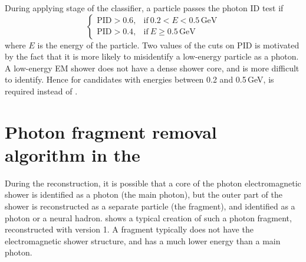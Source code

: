 During applying stage of the classifier, a particle passes the photon ID test if
\begin{equation}
\begin{cases}
  \text{PID} > 0.6, & \text{if}\ 0.2 < E < 0.5\,\text{GeV}\\
  \text{PID} > 0.4, & \text{if}\ E \geqslant 0.5\,\text{GeV}
\end{cases}
\end{equation}
where $E$ is the energy of the particle. Two values of the cuts on $\text{PID}$ is motivated by the fact that it is more likely to misidentify a low-energy particle as a photon. A low-energy EM shower does not have a dense shower core, and is more difficult to identify. Hence for candidates with energies between 0.2 and 0.5\,GeV,  is required instead of .





\section{Photon fragment removal algorithm in the \ECAL}
\label{sec:photonFragRemoval}
During the reconstruction, it is possible that a core of the photon electromagnetic shower is identified as a photon (the main photon), but the outer part of the shower is reconstructed as a separate particle (the fragment), and identified as a photon or a neural hadron.  shows a typical creation of such a photon fragment, reconstructed with \pandora version 1. A fragment typically does not have the electromagnetic shower structure, and has a much lower energy than a main photon.


